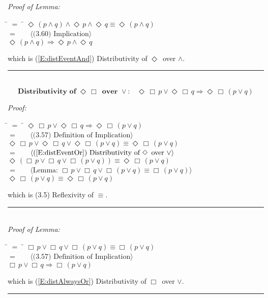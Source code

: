 \documentclass[fleqn, leqno]{article}
\newcommand{\lgap}{2pt} %
\newcommand{\mymathindent}{24pt} %
\newcommand{\Event}{\Diamond\,}
\newcommand{\Always}{\Box\,}
\newcommand{\myqed}{\hfill\rule[-.23ex]{1.2ex}{2.0ex}}
\newcommand{\Gll} {\langle} %
\newcommand{\Ggg} {\rangle} %
\newcommand{\Hint}[1] {\ \ \ $\Gll \mbox{#1} \Ggg$ } %
\begin{document}
\emph{Proof of Lemma:}
\begin{tabbing}
\hspace{\mymathindent} \= $= \;$ \= \kill
\> \> $\Event(p \land q) \land \Event p \land \Event q \equiv \Event(p \land q)$\\[\lgap]
\> $=$ \> \Hint{(3.60) Implication}\\[\lgap]
\> \> $\Event(p \land q) \Rightarrow \Event p \land \Event q$\\[\lgap]
\end{tabbing}
which is (\ref{E:distEventAnd}) Distributivity of $\Event$ over $\land$. \myqed\\[\lgap]


\begin{equation}\label{E:distEventAlwaysOr}
\textbf{Distributivity of $\Event\Always$ over $\lor$:}\quad \Event\Always p \lor \Event\Always q \Rightarrow \Event\Always (p \lor q)
\end{equation}

\emph{Proof:}
\begin{tabbing}
\hspace{\mymathindent} \= $= \;$ \= \kill
\> \> $\Event\Always p \lor \Event\Always q \Rightarrow \Event\Always(p \lor q)$\\[\lgap]
\> $=$ \> \Hint{(3.57) Definition of Implication}\\[\lgap]
\> \> $\Event\Always p \lor \Event\Always q \lor \Event\Always(p \lor q) \equiv \Event\Always(p \lor q)$\\[\lgap]
\> $=$ \> \Hint{(\ref{E:distEventOr}) Distributivity of $\Event$ over $\lor$}\\[\lgap]
\> \> $\Event(\Always p \lor \Always q \lor \Always(p \lor q)) \equiv \Event\Always(p \lor q)$\\[\lgap]
\> $=$ \> \Hint{Lemma: $\Always p \lor \Always q \lor \Always(p \lor q) \equiv \Always(p \lor q)$}\\[\lgap]
\> \> $\Event\Always(p \lor q) \equiv \Event\Always(p \lor q)$\\[\lgap]
\end{tabbing}
which is (3.5) Reflexivity of $\equiv$. \myqed\\[\lgap]


\emph{Proof of Lemma:}
\begin{tabbing}
\hspace{\mymathindent} \= $= \;$ \= \kill
\> \> $\Always p \lor \Always q \lor \Always(p \lor q) \equiv \Always(p \lor q)$\\[\lgap]
\> $=$ \> \Hint{(3.57) Definition of Implication}\\[\lgap]
\> \> $\Always p \lor \Always q \Rightarrow \Always(p \lor q)$\\[\lgap]
\end{tabbing}
which is (\ref{E:distAlwaysOr}) Distributivity of $\Always$ over $\lor$. \myqed\\[\lgap]
\end{document}
